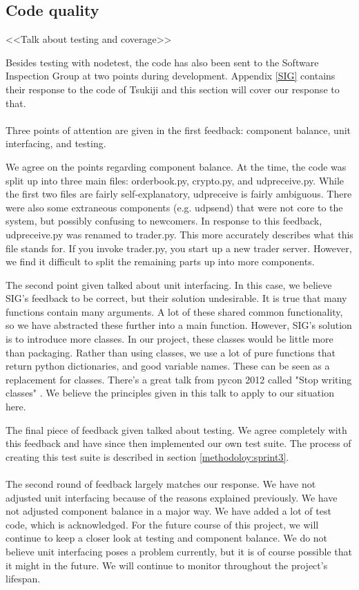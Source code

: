 
\subsection{Code quality}
<<Talk about testing and coverage>>

Besides testing with nodetest, the code has also been sent to the Software Inspection Group at two points during development. Appendix \ref{SIG} contains their response to the code of Tsukiji and this section will cover our response to that.\\
\\
Three points of attention are given in the first feedback: component balance, unit interfacing, and testing.

We agree on the points regarding component balance.
At the time, the code was split up into three main files: orderbook.py, crypto.py, and udpreceive.py.
While the first two files are fairly self-explanatory, udpreceive is fairly ambiguous.
There were also some extraneous components (e.g. udpsend) that were not core to the system, but possibly confusing to newcomers.
In response to this feedback, udpreceive.py was renamed to trader.py.
This more accurately describes what this file stands for.
If you invoke trader.py, you start up a new trader server.
However, we find it difficult to split the remaining parts up into more components.

The second point given talked about unit interfacing.
In this case, we believe SIG's feedback to be correct, but their solution undesirable.
It is true that many functions contain many arguments.
A lot of these shared common functionality, so we have abstracted these further into a main function.
However, SIG's solution is to introduce more classes.
In our project, these classes would be little more than packaging.
Rather than using classes, we use a lot of pure functions that return python dictionaries, and good variable names.
These can be seen as a replacement for classes.
There's a great talk from pycon 2012 called "Stop writing classes" \cite{noclassesvid}.
We believe the principles given in this talk to apply to our situation here.

The final piece of feedback given talked about testing.
We agree completely with this feedback and have since then implemented our own test suite.
The process of creating this test suite is described in section \ref{methodoloy:sprint3}.\\
\\
The second round of feedback largely matches our response.
We have not adjusted unit interfacing because of the reasons explained previously.
We have not adjusted component balance in a major way.
We have added a lot of test code, which is acknowledged.
For the future course of this project, we will continue to keep a closer look at testing and component balance.
We do not believe unit interfacing poses a problem currently, but it is of course possible that it might in the future.
We will continue to monitor throughout the project's lifespan.
